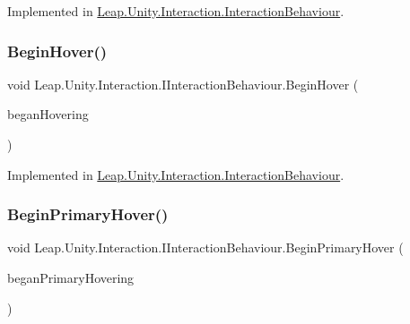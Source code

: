 Implemented in \mbox{\hyperlink{class_leap_1_1_unity_1_1_interaction_1_1_interaction_behaviour_a96eca43283dfd825136e35345a4519f4}{Leap.\+Unity.\+Interaction.\+Interaction\+Behaviour}}.

\mbox{\label{interface_leap_1_1_unity_1_1_interaction_1_1_i_interaction_behaviour_af4c8881fd3bc49d0ea7d09e578c571de}} 
\subsubsection{\texorpdfstring{BeginHover()}{BeginHover()}}
{\footnotesize\ttfamily void Leap.\+Unity.\+Interaction.\+I\+Interaction\+Behaviour.\+Begin\+Hover (\begin{DoxyParamCaption}\item[{List$<$ \mbox{\hyperlink{class_leap_1_1_unity_1_1_interaction_1_1_interaction_controller}{Interaction\+Controller}} $>$}]{began\+Hovering }\end{DoxyParamCaption})}



Implemented in \mbox{\hyperlink{class_leap_1_1_unity_1_1_interaction_1_1_interaction_behaviour_ac25c885f7c0d2ab121c60d1b3b5968c0}{Leap.\+Unity.\+Interaction.\+Interaction\+Behaviour}}.

\mbox{\label{interface_leap_1_1_unity_1_1_interaction_1_1_i_interaction_behaviour_ad653494de7b56532718a6b8dc3d9b412}} 
\subsubsection{\texorpdfstring{BeginPrimaryHover()}{BeginPrimaryHover()}}
{\footnotesize\ttfamily void Leap.\+Unity.\+Interaction.\+I\+Interaction\+Behaviour.\+Begin\+Primary\+Hover (\begin{DoxyParamCaption}\item[{List$<$ \mbox{\hyperlink{class_leap_1_1_unity_1_1_interaction_1_1_interaction_controller}{Interaction\+Controller}} $>$}]{began\+Primary\+Hovering }\end{DoxyParamCaption})}



